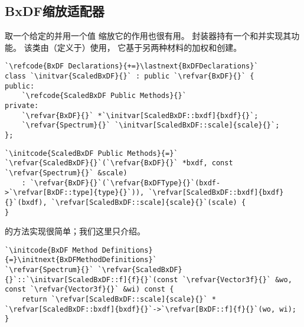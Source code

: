 \subsection{BxDF缩放适配器}\label{sub:BxDF缩放适配器}
取一个给定的并用一个值
缩放它的作用也很有用。
封装器持有一个和并实现其功能。
该类由（定义于）使用，
它基于另两种材料的加权和创建。
\begin{lstlisting}
`\refcode{BxDF Declarations}{+=}\lastnext{BxDFDeclarations}`
class `\initvar{ScaledBxDF}{}` : public `\refvar{BxDF}{}` {
public:
    `\refcode{ScaledBxDF Public Methods}{}`
private:
    `\refvar{BxDF}{}` *`\initvar[ScaledBxDF::bxdf]{bxdf}{}`;
    `\refvar{Spectrum}{}` `\initvar[ScaledBxDF::scale]{scale}{}`;
};
\end{lstlisting}
\begin{lstlisting}
`\initcode{ScaledBxDF Public Methods}{=}`
`\refvar{ScaledBxDF}{}`(`\refvar{BxDF}{}` *bxdf, const `\refvar{Spectrum}{}` &scale)
    : `\refvar{BxDF}{}`(`\refvar{BxDFType}{}`(bxdf->`\refvar[BxDF::type]{type}{}`)), `\refvar[ScaledBxDF::bxdf]{bxdf}{}`(bxdf), `\refvar[ScaledBxDF::scale]{scale}{}`(scale) {
}
\end{lstlisting}

的方法实现很简单；我们这里只介绍。
\begin{lstlisting}
`\initcode{BxDF Method Definitions}{=}\initnext{BxDFMethodDefinitions}`
`\refvar{Spectrum}{}` `\refvar{ScaledBxDF}{}`::`\initvar[ScaledBxDF::f]{f}{}`(const `\refvar{Vector3f}{}` &wo, const `\refvar{Vector3f}{}` &wi) const {
    return `\refvar[ScaledBxDF::scale]{scale}{}` * `\refvar[ScaledBxDF::bxdf]{bxdf}{}`->`\refvar[BxDF::f]{f}{}`(wo, wi);
}
\end{lstlisting}